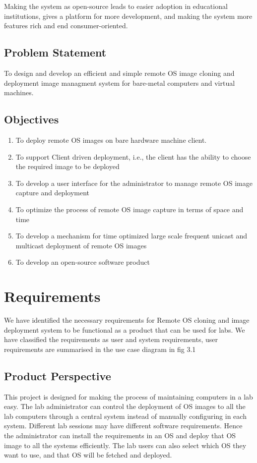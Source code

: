\documentclass[a4paper,12pt]{article}
\begin{document}
 Making the system as open-source leads to easier adoption in educational institutions, gives a platform for more development, and making the system more features rich and end consumer-oriented. 

\subsection{Problem Statement}
To design and develop an efficient and simple remote OS image cloning and deployment image managment system for bare-metal computers and virtual machines.
\subsection{Objectives}
\begin{enumerate}
\item To deploy remote OS images  on bare hardware machine client.
\item To support Client driven deployment, i.e., the client has the ability to choose the required image to be deployed
\item To develop a user interface for the administrator to manage remote OS image capture and deployment
\item To optimize the process of remote OS image capture in terms of space and time
\item To develop a mechanism for time optimized large scale frequent unicast and multicast  deployment of remote OS images 
\item To develop an open-source software product
\end{enumerate}


\newpage
\section{\fontsize{16pt}{1em} Requirements}
We have identified the necessary requirements for Remote OS cloning and image deployment system to be functional as a product that can be used for labs. We have classified the requirements as user and system requirements, user requirements are summarised in the use case diagram in fig 3.1
\subsection{Product Perspective}
This project is designed for making the process of maintaining computers in a lab easy. The lab administrator can control the deployment of OS images to all the lab computers through a central system instead of manually configuring in each system. Different lab sessions may have different software requirements. Hence the administrator can install the requirements in an OS and deploy that OS image to all the systems efficiently. The lab users can also select which OS they want to use, and that OS will be fetched and deployed.
\end{document}
